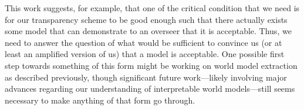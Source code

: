 \documentclass{amsart}
\begin{document}
This work suggests, for example, that one of the critical condition that we need is for our transparency scheme to be good enough such that there actually exists some model that can demonstrate to an overseer that it is acceptable. Thus, we need to answer the question of what would be sufficient to convince us (or at least an amplified version of us) that a model is acceptable. One possible first step towards something of this form might be working on world model extraction as described previously, though significant future work---likely involving major advances regarding our understanding of interpretable world models---still seems necessary to make anything of that form go through.
\end{document}
